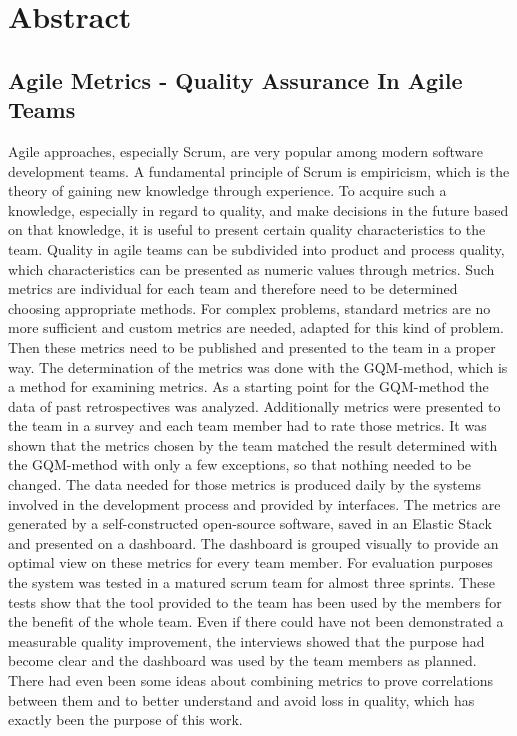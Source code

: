 \newpage
\chapter*{Abstract}
\section*{Agile Metrics {-} Quality Assurance In Agile Teams}

Agile approaches, especially Scrum, are very popular among modern software development teams.
A fundamental principle of Scrum is empiricism, which is the theory of gaining new knowledge through experience.
To acquire such a knowledge, especially in regard to quality, and make decisions in the future based on that knowledge, it is useful to present certain quality characteristics to the team.
Quality in agile teams can be subdivided into product and process quality, which characteristics can be presented as numeric values through metrics.
Such metrics are individual for each team and therefore need to be determined choosing appropriate methods.
For complex problems, standard metrics are no more sufficient and custom metrics are needed, adapted for this kind of problem.
Then these metrics need to be published and presented to the team in a proper way.
The determination of the metrics was done with the \ac{GQM}-method, which is a method for examining metrics.
As a starting point for the \ac{GQM}-method the data of past retrospectives was analyzed.
Additionally metrics were presented to the team in a survey and each team member had to rate those metrics.
It was shown that the metrics chosen by the team matched the result determined with the \ac{GQM}-method with only a few exceptions, so that nothing needed to be changed.
The data needed for those metrics is produced daily by the systems involved in the development process and provided by interfaces.
The metrics are generated by a self-constructed open-source software, saved in an Elastic Stack and presented on a dashboard.
The dashboard is grouped visually to provide an optimal view on these metrics for every team member.
For evaluation purposes the system was tested in a matured scrum team for almost three sprints.
These tests show that the tool provided to the team has been used by the members for the benefit of the whole team.
Even if there could have not been demonstrated a measurable quality improvement, the interviews showed that the purpose had become clear and the dashboard was used by the team members as planned.
There had even been some ideas about combining metrics to prove correlations between them and to better understand and avoid loss in quality, which has exactly been the purpose of this work.
